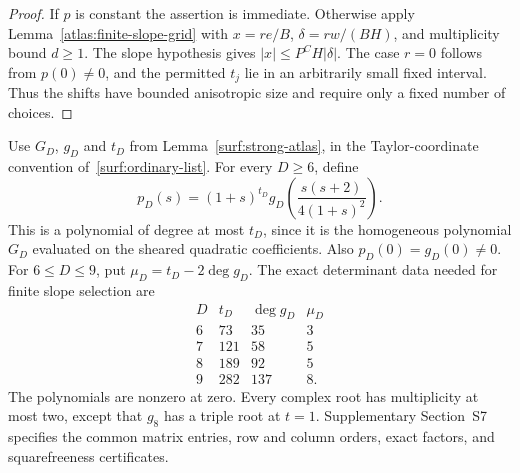 \documentclass[11pt]{amsart}
\theoremstyle{definition}
\theoremstyle{remark}
\numberwithin{equation}{section}
\begin{document}
\begin{proof}
If $p$ is constant the assertion is immediate. Otherwise apply Lemma~\ref{atlas:finite-slope-grid} with $x=re/B$, $\delta=rw/(BH)$, and multiplicity bound $d\ge1$. The slope hypothesis gives $|x|\le P^CH|\delta|$. The case $r=0$ follows from $p(0)\ne0$, and the permitted $t_j$ lie in an arbitrarily small fixed interval. Thus the shifts have bounded anisotropic size and require only a fixed number of choices.
\end{proof}

Use $G_D$, $g_D$ and $t_D$ from Lemma~\ref{surf:strong-atlas}, in the Taylor-coordinate convention of~\eqref{surf:ordinary-list}. For every $D\ge6$, define
\begin{equation}\label{atlas:slope-polynomial}
p_D(s)=(1+s)^{t_D}g_D\!\left(\frac{s(s+2)}{4(1+s)^2}\right).
\end{equation}
This is a polynomial of degree at most $t_D$, since it is the homogeneous polynomial $G_D$ evaluated on the sheared quadratic coefficients. Also $p_D(0)=g_D(0)\ne0$. For $6\le D\le9$, put $\mu_D=t_D-2\deg g_D$. The exact determinant data needed for finite slope selection are
\begin{equation}\label{atlas:slope-data}
\begin{array}{c|rrr}
D&t_D&\deg g_D&\mu_D\\\hline
6&73&35&3\\
7&121&58&5\\
8&189&92&5\\
9&282&137&8.
\end{array}
\end{equation}
The polynomials are nonzero at zero. Every complex root has multiplicity at most two, except that $g_8$ has a triple root at $t=1$. Supplementary Section~S7 specifies the common matrix entries, row and column orders, exact factors, and squarefreeness certificates.
\end{document}
